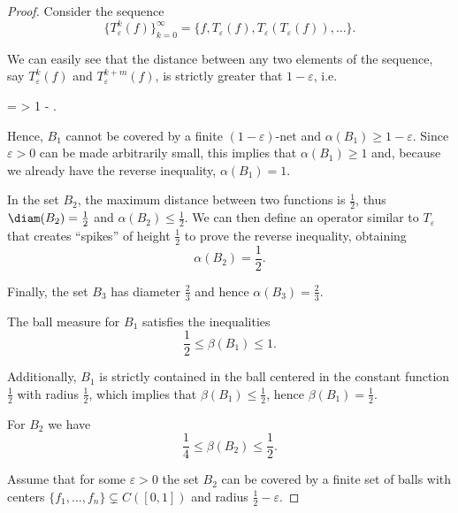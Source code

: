 \begin{proof}
  Consider the sequence
  \begin{equation*}
    \{ T_\varepsilon^k(f) \}_{k=0}^\infty = \{ f, T_\varepsilon(f), T_\varepsilon(T_\varepsilon(f)), \ldots \}.
  \end{equation*}

  We can easily see that the distance between any two elements of the sequence, say \( T_\varepsilon^k(f) \) and \( T_\varepsilon^{k+m}(f) \), is strictly greater that \( 1 - \varepsilon \), i.e.
  \begin{balign*}
    =
    >
    1 - \varepsilon.
  \end{balign*}

  Hence, \( B_1 \) cannot be covered by a finite \( (1-\varepsilon) \)-net and \( \alpha(B_1) \geq 1 - \varepsilon \). Since \( \varepsilon > 0 \) can be made arbitrarily small, this implies that \( \alpha(B_1) \geq 1 \) and, because we already have the reverse inequality, \( \alpha(B_1) = 1 \).

  In the set \( B_2 \), the maximum distance between two functions is \( \frac 1 2 \), thus \( \diam(B_2) = \frac 1 2 \) and \( \alpha(B_2) \leq \frac 1 2 \). We can then define an operator similar to \( T_\varepsilon \) that creates \enquote{spikes} of height \( \frac 1 2 \) to prove the reverse inequality, obtaining
  \begin{equation*}
    \alpha(B_2) = \frac 1 2.
  \end{equation*}

  Finally, the set \( B_3 \) has diameter \( \frac 2 3 \) and hence \( \alpha(B_3) = \frac 2 3 \).

  The ball measure for \( B_1 \) satisfies the inequalities
  \begin{equation*}
    \frac 1 2 \leq \beta(B_1) \leq 1.
  \end{equation*}

  Additionally, \( B_1 \) is strictly contained in the ball centered in the constant function \( \frac 1 2 \) with radius \( \frac 1 2 \), which implies that \( \beta(B_1) \leq \frac 1 2 \), hence \( \beta(B_1) = \frac 1 2 \).

  For \( B_2 \) we have
  \begin{equation*}
    \frac 1 4 \leq \beta(B_2) \leq \frac 1 2.
  \end{equation*}

  Assume that for some \( \varepsilon > 0 \) the set \( B_2 \) can be covered by a finite set of balls with centers \( \{ f_1, \ldots, f_n \} \subsetneq C([0, 1]) \) and radius \( \frac 1 2 - \varepsilon \).


\end{proof}
